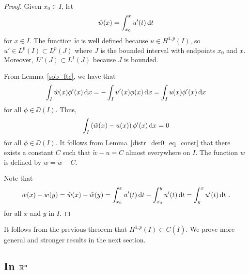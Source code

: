 \begin{proof}
Given $x_0 \in I$, let
\[
\tilde{w}(x) = \int_{x_0}^x u'(t) \,\mathrm{d}{t}
\]
for $x \in I$.  The function $\tilde{w}$ is well defined because
$\displaystyle u \in H^{1,p}(I)$, so
$\displaystyle u' \in L^p(I) \subset L^p(J)$
where $J$ is the bounded interval with endpoints $x_0$ and
$x$.  Moreover, $\displaystyle L^p(J) \subset L^1(J)$ because $J$ is bounded.

From Lemma~\ref{sob_ftc}, we have that
\[
\int_I \tilde{w}(x) \phi'(x) \,\mathrm{d}{x} = - \int_I u'(x) \phi(x) \,\mathrm{d}{x}
= \int_I u(x) \phi'(x) \,\mathrm{d}{x}
\]
for all $\phi \in \DD(I)$.  Thus,
\[
\int_I \left( \tilde{w}(x) - u(x)\right) \phi'(x) \,\mathrm{d}{x} = 0
\]
for all $\phi \in \DD(I)$.  It follows from
Lemma~\ref{distr_der0_eq_const} that there exists a constant $C$ such
that $\tilde{w} - u = C$ almost everywhere on $I$.  The function $w$
is defined by $w = \tilde{w} - C$.

Note that
\[
w(x) - w(y) = \tilde{w}(x) - \tilde{w}(y) =
\int_{x_0}^x u'(t) \,\mathrm{d}{t} - \int_{x_0}^y u'(t) \,\mathrm{d}{t}
= \int_y^x u'(t) \,\mathrm{d}{t} \ .
\]
for all $x$ and $y$ in $I$.
\end{proof}

It follows from the previous theorem that
$\displaystyle H^{1,p}(I) \subset C(\overline{I})$.  We prove more
general and stronger results in the next section.

\subsection{In $\displaystyle \mathbf{\mathbb{R}^n}$}

